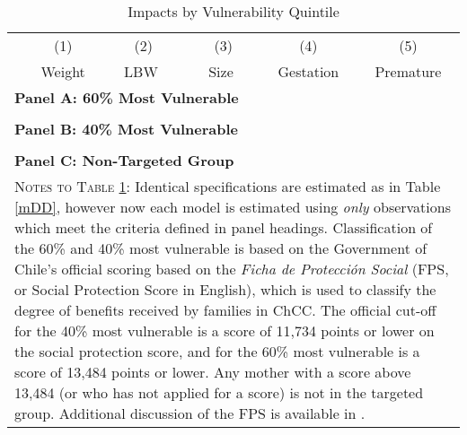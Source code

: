\documentclass[12pt]{article}
\begin{document}
\begin{spacing}{1.4}
\begin{table}[ht!]
  \begin{center}
    \caption{Impacts by Vulnerability Quintile}
    \label{tab:FPS}
    \begin{tabular}{lccccc} \toprule
      &(1)&(2)&(3)&(4)&(5)\\
      & Weight &\ \ LBW \ \ &\ \  Size \  \ & Gestation & Premature \\ \midrule
      \multicolumn{6}{l}{\textbf{Panel A: 60\% Most Vulnerable}} \\
      
      \\
      \multicolumn{6}{l}{\textbf{Panel B: 40\% Most Vulnerable}} \\
      
      \\
      \multicolumn{6}{l}{\textbf{Panel C: Non-Targeted Group}} \\
      
      \bottomrule
      \multicolumn{6}{p{14.7cm}}{{\footnotesize \textsc{Notes to Table \ref{tab:FPS}}:
          Identical specifications are estimated as in Table \ref{mDD}, however now each
          model is estimated using \emph{only} observations which meet the criteria
          defined in panel headings. Classification of the 60\% and 40\% most vulnerable
          is based on the Government of Chile's official scoring based on the
          \emph{Ficha de Protecci\'on Social} (FPS, or Social Protection Score in English),
          which is used to classify the degree of benefits received by families in ChCC.
          The official cut-off for the 40\% most vulnerable is a score of 11,734 points or
          lower on the social protection score, and for the 60\% most vulnerable is a score
          of 13,484 points or lower.  Any mother with a score above 13,484 (or who has not
          applied for a score) is not in the targeted group. Additional discussion of the
          FPS is available in \citet{Herreraetal2010}.}} \\
    \end{tabular}
  \end{center}
\end{table}


\end{spacing}
\end{document}
